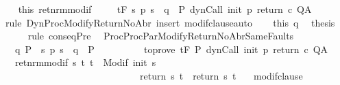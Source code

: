 \begin{isabellebody}
\ \ \isamarkupfalse%
\ this\ ret{\isacharunderscore}nrm{\isacharunderscore}modif\ \isanewline
\ \ \isamarkupfalse%
\ {\isachardoublequoteopen}{\isasymGamma}{\isacharcomma}{\isasymTheta}{\isasymturnstile}\isactrlsub t\isactrlbsub {\isacharslash}F\isactrlesub \ {\isacharparenleft}{\isacharbraceleft}s{\isachardot}\ p\ s\ {\isacharequal}\ q{\isacharbraceright}\ {\isasyminter}\ P{\isacharprime}{\isacharparenright}\ {\isacharparenleft}dynCall\ init\ p\ return\ c{\isacharparenright}\ Q{\isacharcomma}A{\isachardoublequoteclose}\isanewline
\ \ \ \ \isamarkupfalse%
\ {\isacharparenleft}rule\ DynProcModifyReturnNoAbr{\isacharparenright}\ {\isacharparenleft}insert\ modif{\isacharunderscore}clause{\isacharcomma}auto{\isacharparenright}\isanewline
\ \ \isamarkupfalse%
\ this\ q\ \isamarkupfalse%
\ {\isacharquery}thesis\isanewline
\ \ \ \ \isamarkupfalse%
\ {\isacharparenleft}rule\ conseqPre{\isacharparenright}\ \isanewline
{}\isamarkupfalse%
%
\endisatagproof
{\isafoldproof}%
%
\isadelimproof
\isanewline
%
\endisadelimproof
\isanewline
\isanewline
{}\isamarkupfalse%
\ ProcProcParModifyReturnNoAbrSameFaults{\isacharcolon}\ \isanewline
\ \ \ q{\isacharcolon}\ {\isachardoublequoteopen}P\ {\isasymsubseteq}\ {\isacharbraceleft}s{\isachardot}\ p\ s\ {\isacharequal}\ q{\isacharbraceright}\ {\isasyminter}\ P{\isacharprime}{\isachardoublequoteclose}\isanewline
\ \ \ \ \ \ %
\isanewline
\ \ \ to{\isacharunderscore}prove{\isacharcolon}\ {\isachardoublequoteopen}{\isasymGamma}{\isacharcomma}{\isasymTheta}{\isasymturnstile}\isactrlsub t\isactrlbsub {\isacharslash}F\isactrlesub \ P{\isacharprime}\ {\isacharparenleft}dynCall\ init\ p\ return{\isacharprime}\ c{\isacharparenright}\ Q{\isacharcomma}A{\isachardoublequoteclose}\isanewline
\ \ \ ret{\isacharunderscore}nrm{\isacharunderscore}modif{\isacharcolon}\ {\isachardoublequoteopen}{\isasymforall}s\ t{\isachardot}\ t\ {\isasymin}\ {\isacharparenleft}Modif\ {\isacharparenleft}init\ s{\isacharparenright}{\isacharparenright}\ \isanewline
\ \ \ \ \ \ \ \ \ \ \ \ \ \ \ \ \ \ \ \ \ \ \ \ \ \ \ \ {\isasymlongrightarrow}\ return{\isacharprime}\ s\ t\ {\isacharequal}\ return\ s\ t{\isachardoublequoteclose}\isanewline
\ \ \ modif{\isacharunderscore}clause{\isacharcolon}\ \isanewline

\end{isabellebody}
